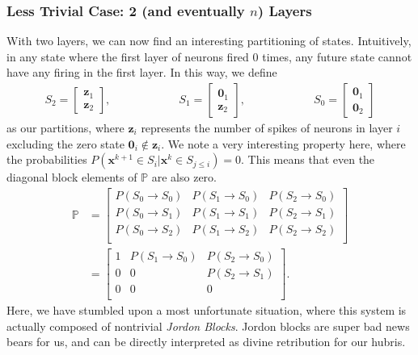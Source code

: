 \documentclass[superscriptaddress]{revtex4-1}
\newcommand{\prob}{\mathbb{P}}
\begin{document}
\subsubsection{Less Trivial Case: 2 (and eventually $n$) Layers}
With two layers, we can now find an interesting partitioning of states. Intuitively, in any state where the first layer of neurons fired 0 times, any future state cannot have any firing in the first layer. In this way, we define
\begin{align*}
S_2 = 
\begin{bmatrix}
\bm{z}_1\\
\bm{z}_2
\end{bmatrix},
\hspace{1in}
S_1 = 
\begin{bmatrix}
\bm{0}_1\\
\bm{z}_2
\end{bmatrix},
\hspace{1in}
S_0 = 
\begin{bmatrix}
\bm{0}_1\\
\bm{0}_2
\end{bmatrix}
\end{align*}
as our partitions, where $\bm{z}_i$ represents the number of spikes of neurons in layer $i$ excluding the zero state $\bm{0}_i \notin \bm{z}_i$. We note a very interesting property here, where the probabilities $P(\bm{x}^{k+1} \in S_i | \bm{x}^k \in S_{j \leq i}) = 0$. This means that even the diagonal block elements of $\prob$ are also zero.
\begin{align*}
\prob 
&= 
\begin{bmatrix}
P(S_0 \rightarrow S_0) & P(S_1 \rightarrow S_0) & P(S_2 \rightarrow S_0)\\
P(S_0 \rightarrow S_1) & P(S_1 \rightarrow S_1) & P(S_2 \rightarrow S_1)\\
P(S_0 \rightarrow S_2) & P(S_1 \rightarrow S_2) & P(S_2 \rightarrow S_2)\\
\end{bmatrix}\\
&= 
\begin{bmatrix}
1 & P(S_1 \rightarrow S_0) & P(S_2 \rightarrow S_0)\\
0 & 0 & P(S_2 \rightarrow S_1)\\
0 & 0 & 0\\
\end{bmatrix}.
\end{align*}
Here, we have stumbled upon a most unfortunate situation, where this system is actually composed of nontrivial \emph{Jordon Blocks}. Jordon blocks are super bad news bears for us, and can be directly interpreted as divine retribution for our hubris. 
\newpage~\newpage
\end{document}

